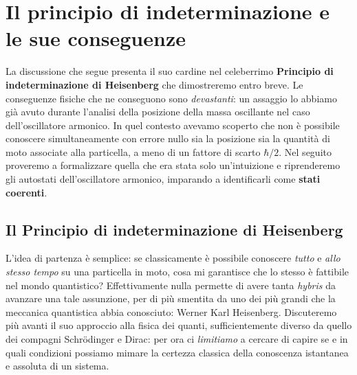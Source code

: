 
\chapter{Il principio di indeterminazione e le sue conseguenze}
La discussione che segue presenta il suo cardine nel celeberrimo \textbf{Principio di indeterminazione di Heisenberg} che dimostreremo entro breve. Le conseguenze fisiche che ne conseguono sono \emph{devastanti}: un assaggio lo abbiamo già avuto durante l'analisi della posizione della massa oscillante nel caso dell'oscillatore armonico. In quel contesto avevamo scoperto che non è possibile conoscere simultaneamente con errore nullo sia la posizione sia la quantità di moto associate alla particella, a meno di un fattore di scarto $\hbar/2$. Nel seguito proveremo a formalizzare quella che era stata solo un'intuizione e riprenderemo gli autostati dell'oscillatore armonico, imparando a identificarli come \textbf{stati coerenti}.

\section{Il Principio di indeterminazione di Heisenberg}
L'idea di partenza è semplice: se classicamente è possibile conoscere \emph{tutto} e \emph{allo stesso tempo} su una particella in moto, cosa mi garantisce che lo stesso è fattibile nel mondo quantistico? Effettivamente nulla permette di avere tanta \emph{hybris} da avanzare una tale assunzione, per di più smentita da uno dei più grandi che la meccanica quantistica abbia conosciuto: Werner Karl Heisenberg. Discuteremo più avanti il suo approccio alla fisica dei quanti, sufficientemente diverso da quello dei compagni Schrödinger e Dirac: per ora ci \emph{limitiamo} a cercare di capire se e in quali condizioni possiamo mimare la certezza classica della conoscenza istantanea e assoluta di un sistema. 

